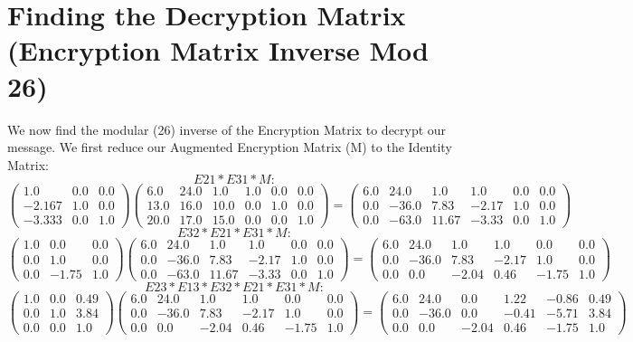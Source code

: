 \documentclass{article}%
\begin{document}
\section{Finding the Decryption Matrix (Encryption Matrix Inverse Mod 26)}%
\label{sec:FindingtheDecryptionMatrix(EncryptionMatrixInverseMod26)}%
We now find the modular (26) inverse of the Encryption Matrix to decrypt our message. \newline%
 \newline%
%
We first reduce our Augmented Encryption Matrix (M) to the Identity Matrix: \newline%
 \newline%
%
\[%
E21 * E31 * M:%
\]%
\[%
\begin{pmatrix}%
1.0&0.0&0.0\\%
-2.167&1.0&0.0\\%
-3.333&0.0&1.0%
\end{pmatrix} \begin{pmatrix}%
6.0&24.0&1.0&1.0&0.0&0.0\\%
13.0&16.0&10.0&0.0&1.0&0.0\\%
20.0&17.0&15.0&0.0&0.0&1.0%
\end{pmatrix} = \begin{pmatrix}%
6.0&24.0&1.0&1.0&0.0&0.0\\%
0.0&-36.0&7.83&-2.17&1.0&0.0\\%
0.0&-63.0&11.67&-3.33&0.0&1.0%
\end{pmatrix}%
\]%
\newline%
%
\[%
E32 * E21 * E31 * M:%
\]%
\[%
\begin{pmatrix}%
1.0&0.0&0.0\\%
0.0&1.0&0.0\\%
0.0&-1.75&1.0%
\end{pmatrix} \begin{pmatrix}%
6.0&24.0&1.0&1.0&0.0&0.0\\%
0.0&-36.0&7.83&-2.17&1.0&0.0\\%
0.0&-63.0&11.67&-3.33&0.0&1.0%
\end{pmatrix} = \begin{pmatrix}%
6.0&24.0&1.0&1.0&0.0&0.0\\%
0.0&-36.0&7.83&-2.17&1.0&0.0\\%
0.0&0.0&-2.04&0.46&-1.75&1.0%
\end{pmatrix}%
\]%
\newline%
%
\[%
E23 * E13 * E32 * E21 * E31 * M:%
\]%
\[%
\begin{pmatrix}%
1.0&0.0&0.49\\%
0.0&1.0&3.84\\%
0.0&0.0&1.0%
\end{pmatrix} \begin{pmatrix}%
6.0&24.0&1.0&1.0&0.0&0.0\\%
0.0&-36.0&7.83&-2.17&1.0&0.0\\%
0.0&0.0&-2.04&0.46&-1.75&1.0%
\end{pmatrix} = \begin{pmatrix}%
6.0&24.0&0.0&1.22&-0.86&0.49\\%
0.0&-36.0&0.0&-0.41&-5.71&3.84\\%
0.0&0.0&-2.04&0.46&-1.75&1.0%
\end{pmatrix}%
\]%
\end{document}
